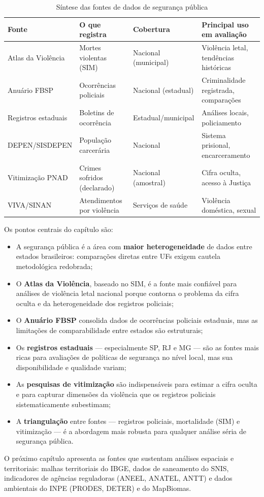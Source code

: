 \begin{table}[H]
\centering
\caption{Síntese das fontes de dados de segurança pública}
\label{tab:sintese_cap8}
\small
\begin{tabularx}{\textwidth}{@{} >{\raggedright\arraybackslash}p{2.8cm} >{\raggedright\arraybackslash}p{3.2cm} >{\raggedright\arraybackslash}p{2.8cm} X @{}}
\toprule
\textbf{Fonte} & \textbf{O que registra} & \textbf{Cobertura} &
\textbf{Principal uso em avaliação} \\
\midrule
Atlas da Violência  & Mortes violentas (SIM)       & Nacional (municipal) & Violência letal, tendências históricas \\
Anuário FBSP        & Ocorrências policiais        & Nacional (estadual)  & Criminalidade registrada, comparações \\
Registros estaduais & Boletins de ocorrência       & Estadual\slash \allowbreak municipal   & Análises locais, policiamento \\
DEPEN\slash \allowbreak SISDEPEN      & População carcerária         & Nacional             & Sistema prisional, encarceramento \\
Vitimização PNAD    & Crimes sofridos (declarado)  & Nacional (amostral)  & Cifra oculta, acesso à Justiça \\
VIVA/SINAN          & Atendimentos por violência   & Serviços de saúde    & Violência doméstica, sexual \\
\bottomrule
\end{tabularx}
\end{table}

Os pontos centrais do capítulo são:

\begin{itemize}
  \item A segurança pública é a área com \textbf{maior heterogeneidade} de dados entre estados brasileiros: comparações diretas entre UFs exigem cautela metodológica redobrada;
  \item O \textbf{Atlas da Violência}, baseado no SIM, é a fonte mais confiável para análises de violência letal nacional porque contorna o problema da cifra oculta e da heterogeneidade dos registros policiais;
  \item O \textbf{Anuário FBSP} consolida dados de ocorrências policiais estaduais, mas as limitações de comparabilidade entre estados são estruturais;
  \item Os \textbf{registros estaduais} --- especialmente SP, RJ e MG --- são as fontes mais ricas para avaliações de políticas de segurança no nível local, mas sua disponibilidade e qualidade variam;
  \item As \textbf{pesquisas de vitimização} são indispensáveis para estimar a cifra oculta e para capturar dimensões da violência que os registros policiais sistematicamente subestimam;
  \item A \textbf{triangulação} entre fontes --- registros policiais, mortalidade (SIM) e vitimização --- é a abordagem mais robusta para qualquer análise séria de segurança pública.
\end{itemize}

O próximo capítulo apresenta as fontes que sustentam análises espaciais e territoriais: malhas territoriais do IBGE, dados de saneamento do SNIS, indicadores de agências reguladoras (ANEEL, ANATEL, ANTT) e dados ambientais do INPE (PRODES, DETER) e do MapBiomas.